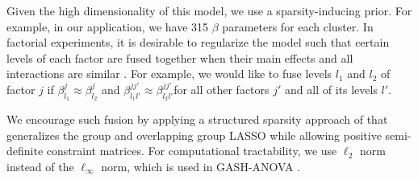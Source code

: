 \documentclass[11pt]{article}
\begin{document}
Given the high dimensionality of this model, we use a
sparsity-inducing prior.  For example, in our application, we have 315
$\beta$ parameters for each cluster.  In factorial experiments, it is
desirable to regularize the model such that certain levels of each
factor are fused together when their main effects and all interactions
are similar \citep{post2013factor,egam:imai:19}.  For example, we
would like to fuse levels $l_1$ and $l_2$ of factor $j$ if
$\beta^j_{l_1} \approx \beta^j_{l_2}$ and
$\beta^{jj'}_{l_1 l'} \approx \beta^{jj'}_{l_2 l'} $for all other
factors $j'$ and all of its levels $l'$.

We encourage such fusion by applying a structured sparsity approach of
\citet{goplerud2021sparsity} that generalizes the group and
overlapping group LASSO
\citep[e.g.,][]{yuan:lin:06,yan2017hierarchical} while allowing
positive semi-definite constraint matrices.  For computational
tractability, we use $\ell_2$ norm instead of the $\ell_\infty$ norm,
which is used in GASH-ANOVA \citep{post2013factor}.
\end{document}

